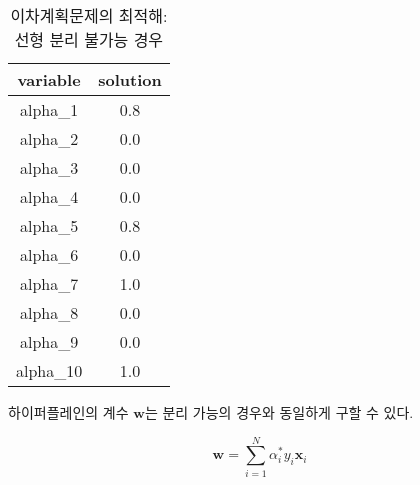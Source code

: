 \documentclass[
]{book}
\newenvironment{Shaded}{\begin{snugshade}}{\end{snugshade}}
\newcommand{\DecValTok}[1]{\textcolor[rgb]{0.00,0.00,0.81}{#1}}
\newcommand{\FunctionTok}[1]{\textcolor[rgb]{0.00,0.00,0.00}{#1}}
\newcommand{\NormalTok}[1]{#1}
\newcommand{\OtherTok}[1]{\textcolor[rgb]{0.56,0.35,0.01}{#1}}
\newcommand{\SpecialCharTok}[1]{\textcolor[rgb]{0.00,0.00,0.00}{#1}}
\newcommand{\StringTok}[1]{\textcolor[rgb]{0.31,0.60,0.02}{#1}}
\begin{document}
\begin{Shaded}
\end{Shaded}

\begin{table}

\caption{\label{tab:svm-inseparable-alpha}이차계획문제의 최적해: 선형 분리 불가능 경우}
\centering
\begin{tabular}[t]{cc}
\toprule
variable & solution\\
\midrule
alpha\_1 & 0.8\\
alpha\_2 & 0.0\\
alpha\_3 & 0.0\\
alpha\_4 & 0.0\\
alpha\_5 & 0.8\\
\addlinespace
alpha\_6 & 0.0\\
alpha\_7 & 1.0\\
alpha\_8 & 0.0\\
alpha\_9 & 0.0\\
alpha\_10 & 1.0\\
\bottomrule
\end{tabular}
\end{table}

하이퍼플레인의 계수 \(\mathbf{w}\)는 분리 가능의 경우와 동일하게 구할 수 있다.

\begin{equation*}
\mathbf{w} = \sum_{i = 1}^{N} \alpha_{i}^{*} y_{i} \mathbf{x}_{i}
\end{equation*}
\end{document}
